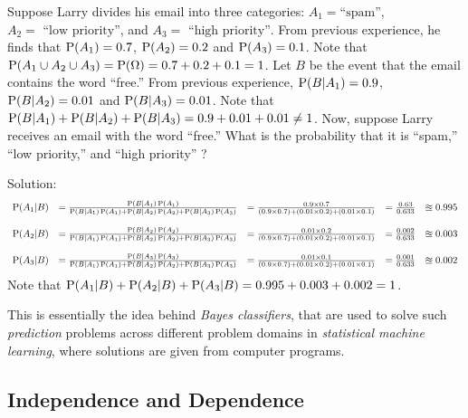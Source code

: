 \begin{example}[Wasserman2003~p.12]\label{Wasserman2003p12}
Suppose Larry divides his email into three categories: $A_1 = \text{``spam''}$, $A_2 =\text{ ``low priority''}$, and $A_3 = \text{ ``high priority''}$.  From previous experience, he finds that $\P(A_1) = 0.7$, $\P(A_2) = 0.2$ and $\P(A_3)=0.1$.  Note that $\P(A_1 \cup A_2 \cup A_3) = \P(\Omega) = 0.7+0.2+0.1 = 1$.  Let $B$ be the event that the email contains the word ``free.''  From previous experience, $\P(B|A_1) = 0.9$, $\P(B|A_2) = 0.01$ and $\P(B|A_3)=0.01$.  Note that $\P(B|A_1) + \P(B|A_2) + \P(B|A_3) = 0.9+0.01+0.01 \neq 1$.  Now, suppose Larry receives an email with the word ``free.''  What is the probability that it is ``spam,'' ``low priority,''  and ``high priority'' ?

Solution:\\[4pt]
{\scriptsize{
\[
\begin{array}{l l l l l}
\P(A_1 | B) 
&= \frac{\P(B|A_1)\P(A_1)}{\P(B|A_1)\P(A_1)+\P(B|A_2)\P(A_2)+\P(B|A_3)\P(A_3)} 
&= \frac{0.9 \times 0.7}{(0.9 \times 0.7)+ (0.01 \times 0.2) + (0.01 \times 0.1)}
&= \frac{0.63}{0.633}
&\approxeq 0.995 \\
\\
\P(A_2 | B) 
&= \frac{\P(B|A_2)\P(A_2)}{\P(B|A_1)\P(A_1)+\P(B|A_2)\P(A_2)+\P(B|A_3)\P(A_3)} 
&= \frac{0.01 \times 0.2}{(0.9 \times 0.7)+ (0.01 \times 0.2) + (0.01 \times 0.1)}
&= \frac{0.002}{0.633}
&\approxeq 0.003 \\
\\
\P(A_3 | B) 
&= \frac{\P(B|A_3)\P(A_3)}{\P(B|A_1)\P(A_1)+\P(B|A_2)\P(A_2)+\P(B|A_3)\P(A_3)} 
&= \frac{0.01 \times 0.1}{(0.9 \times 0.7)+ (0.01 \times 0.2) + (0.01 \times 0.1)}
&= \frac{0.001}{0.633}
&\approxeq 0.002 \\
\end{array}
\]
Note that $\P(A_1|B) + \P(A_2|B)+\P(A_3|B) = 0.995+0.003+0.002=1$.
}}

This is essentially the idea behind \emph{Bayes classifiers}, that are used to solve such \emph{prediction} problems across different problem domains in \emph{statistical machine learning}, where solutions are given from computer programs.
\end{example}

\subsection{Independence and Dependence}\label{S:IndepDep}

